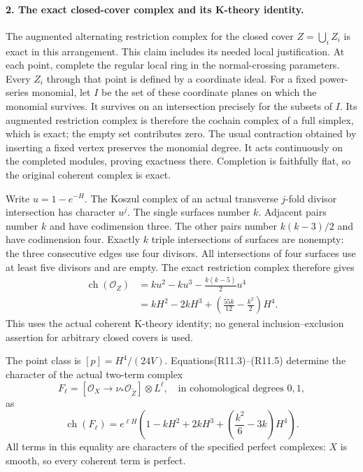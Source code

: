 \paragraph{2. The exact closed-cover complex and its K-theory identity.}
The augmented alternating restriction complex for the closed
cover $Z=\bigcup_iZ_i$ is exact in this arrangement. This
claim includes its needed local justification. At each point,
complete the regular local ring in the normal-crossing
parameters. Every $Z_i$ through that point is defined by a
coordinate ideal. For a fixed power-series monomial, let $I$
be the set of these coordinate planes on which the monomial
survives. It survives on an intersection precisely for the
subsets of $I$. Its augmented restriction complex is therefore
the cochain complex of a full simplex, which is exact; the
empty set contributes zero. The usual contraction obtained
by inserting a fixed vertex preserves the monomial degree.
It acts continuously on the completed modules, proving exactness
there. Completion is faithfully flat, so the original coherent
complex is exact.

Write $u=1-e^{-H}$. The Koszul complex of an actual transverse
$j$-fold divisor intersection has character $u^j$.
The single surfaces number $k$. Adjacent pairs number $k$ and
have codimension three. The other pairs number $k(k-3)/2$
and have codimension four. Exactly $k$ triple intersections
of surfaces are nonempty: the three consecutive edges use
four divisors. All intersections of four surfaces use at least
five divisors and are empty. The exact restriction complex
therefore gives
\[
 \begin{split}
 \operatorname{ch}(\mathcal O_Z)
     &=ku^2-ku^3-\frac{k(k-5)}2u^4\\
     &=kH^2-2kH^3+\left(\frac{55k}{12}-\frac{k^2}2\right)H^4.
 \end{split}                                                \tag{R11.5}
\]
This uses the actual coherent K-theory identity; no general
inclusion--exclusion assertion for arbitrary closed covers is used.

The point class is $[p]=H^4/(24V)$. Equations(R11.3)--(R11.5)
determine the character of the actual two-term complex
\[
 F_\ell=\left[\mathcal O_X\longrightarrow
                       \nu_*\mathcal O_{\widetilde Z}\right]\otimes L^\ell,
           \quad\text{in cohomological degrees }0,1,
                                                               \tag{R11.6}
\]
as
\[
 \operatorname{ch}(F_\ell)=e^{\ell H}
      \left(1-kH^2+2kH^3+\left(\frac{k^2}{6}-3k\right)H^4\right).
                                                               \tag{R11.7}
\]
All terms in this equality are characters of the specified
perfect complexes: $X$ is smooth, so every coherent term is
perfect.

